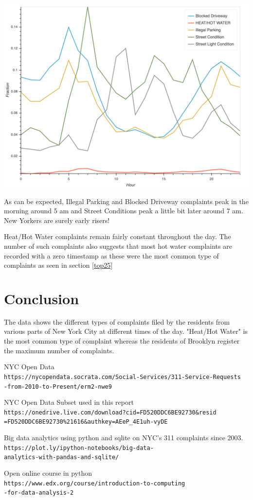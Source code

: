 \documentclass[12pt,a4paper]{article}
\begin{document}
\includegraphics[scale=0.2]{timeseries}

As can be expected, Illegal Parking and Blocked Driveway complaints peak in the morning around 5 am and Street Conditions peak a little bit later around 7 am. New Yorkers are surely early risers!

Heat/Hot Water complaints remain fairly constant throughout the day. The number of such complaints also suggests that most hot water complaints are recorded with a zero timestamp as these were the most common type of complaints as seen in section \ref{top25}

\section{Conclusion}
The data shows the different types of complaints filed by the residents from various parts of New York City at different times of the day. "Heat/Hot Water" is the most common type of complaint whereas the residents of Brooklyn register the maximum number of complaints.

\begin{thebibliography}{9}
NYC Open Data
\\\texttt{https://nycopendata.socrata.com/Social-Services/311-Service-Requests\\-from-2010-to-Present/erm2-nwe9}


NYC Open Data Subset used in this report
\\\texttt{https://onedrive.live.com/download?cid=FD520DDC6BE92730\&resid\\=FD520DDC6BE92730\%21616\&authkey=AEeP\_4E1uh-vyDE}

Big data analytics using python and sqlite on NYC's 311 complaints since 2003.
\\\texttt{https://plot.ly/ipython-notebooks/big-data-\\analytics-with-pandas-and-sqlite/}

Open online course in python
\\\texttt{https://www.edx.org/course/introduction-to-computing\\-for-data-analysis-2}


\end{thebibliography}
\end{document}

